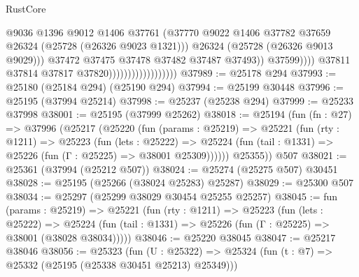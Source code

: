 \begin{lexlean}{RustCore}
\begin{coremodule}
                                                      @9036
                                                      @1396
                                                      @9012
                                                      @1406
                                                      @37761
                                                      (@37770
                                                        @9022
                                                        @1406
                                                        @37782
                                                        @37659
                                                        @26324
                                                        (@25728 (@26326 @9023 @1321)))
                                                      @26324
                                                      (@25728 (@26326 @9013 @9029)))
                                                    @37472
                                                    @37475
                                                    @37478
                                                    @37482
                                                    @37487
                                                    @37493))
                                                @37599))))
                                        @37811
                                        @37814
                                        @37817
                                        @37820))))))))))))))))))
@37989 := @25178 @294
@37993 := @25180 (@25184 @294) (@25190 @294)
@37994 := @25199 @30448
@37996 := @25195 (@37994 @25214)
@37998 := @25237 (@25238 @294)
@37999 := @25233 @37998
@38001 := @25195 (@37999 @25262)
@38018 := @25194
    (fun (fn : @27) =>
    @37996
      (@25217
        (@25220
          (fun (params : @25219) =>
          @25221
            (fun (rty : @1211) =>
            @25223
              (fun (lets : @25222) =>
              @25224 (fun (tail : @1331) => @25226 (fun (Γ : @25225) => @38001 @25309))))))
        @25355))
    @507
@38021 := @25361 (@37994 (@25212 @507))
@38024 := @25274 (@25275 @507) @30451
@38028 := @25195 (@25266 (@38024 @25283) @25287)
@38029 := @25300 @507
@38034 := @25297 (@25299 @38029 @30454 @25255 @25257)
@38045 := fun (params : @25219) =>
  @25221
    (fun (rty : @1211) =>
    @25223
      (fun (lets : @25222) =>
      @25224 (fun (tail : @1331) => @25226 (fun (Γ : @25225) => @38001 (@38028 @38034)))))
@38046 := @25220 @38045
@38047 := @25217 @38046
@38056 := @25323
    (fun (U : @25322) => @25324 (fun (t : @7) => @25332 (@25195 (@25338 @30451 @25213) @25349)))

\end{coremodule}
\end{lexlean}
